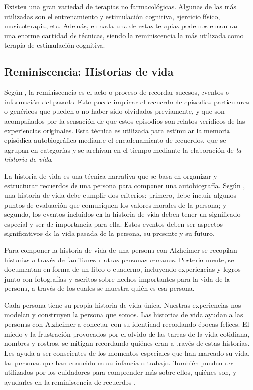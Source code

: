 Existen una gran variedad de terapias no farmacológicas. Algunas de las más utilizadas son el entrenamiento y estimulación cognitiva, ejercicio físico, musicoterapia, etc. Además, en cada una de estas terapias podemos encontrar una enorme cantidad de técnicas, siendo la reminiscencia la más utilizada como terapia de estimulación cognitiva.


\subsection{Reminiscencia: Historias de vida}
Según \cite{o2013cross}, la reminiscencia es el acto o proceso de recordar sucesos, eventos o información del pasado. Esto puede implicar el recuerdo de episodios particulares o genéricos que pueden o no haber sido olvidados previamente, y que son acompañados por la sensación de que estos episodios son relatos verídicos de las experiencias originales. Esta técnica es utilizada para estimular la memoria episódica autobiográfica mediante el encadenamiento de recuerdos, que se agrupan en categorías y se archivan en el tiempo mediante la elaboración de \textit{la historia de vida}.


La historia de vida es una técnica narrativa que se basa en organizar y estructurar recuerdos de una persona para componer una autobiografía. Según \cite{linde1993life}, una historia de vida debe cumplir dos criterios: primero, debe incluir algunos puntos de evaluación que comuniquen los valores morales de la persona; y segundo, los eventos incluidos en la historia de vida deben tener un significado especial y ser de importancia para ella. Estos eventos deben ser aspectos significativos de la vida pasada de la persona, su presente y su futuro.

Para componer la historia de vida de una persona con Alzheimer se recopilan historias a través de familiares u otras personas cercanas. Posteriormente, se documentan en forma de un libro o cuaderno, incluyendo experiencias y logros junto con fotografías y escritos sobre hechos importantes para la vida de la persona, a través de los cuales se muestra quién es esa persona.

Cada persona tiene su propia historia de vida única. Nuestras experiencias nos modelan y construyen la persona que somos. Las historias de vida ayudan a las personas con Alzheimer a conectar con su identidad recordando épocas felices. El miedo y la frustración provocados por el olvido de las tareas de la vida cotidiana, nombres y rostros, se mitigan recordando quiénes eran a través de estas historias. Les ayuda a ser conscientes de los momentos especiales que han marcado su vida, las personas que han conocido en su infancia o trabajo. También pueden ser utilizados por los cuidadores para comprender más sobre ellos, quiénes son, y ayudarles en la reminiscencia de recuerdos \citep{karlsson2014stories}.


